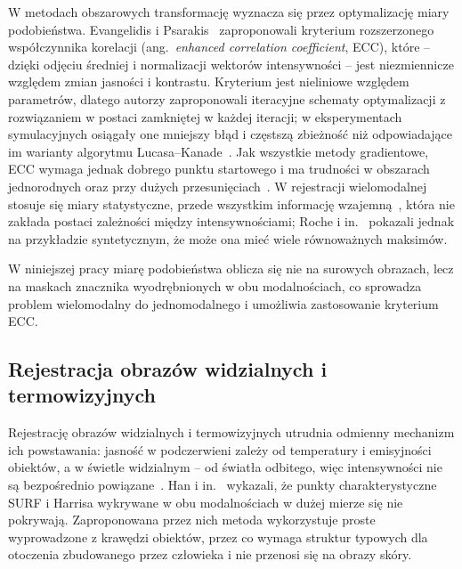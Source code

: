 W metodach obszarowych transformację wyznacza się przez optymalizację miary podobieństwa. Evangelidis i Psarakis~\cite{evangelidis2008} zaproponowali kryterium rozszerzonego współczynnika korelacji (ang.~\textit{enhanced correlation coefficient}, ECC), które -- dzięki odjęciu średniej i normalizacji wektorów intensywności -- jest niezmiennicze względem zmian jasności i kontrastu. Kryterium jest nieliniowe względem parametrów, dlatego autorzy zaproponowali iteracyjne schematy optymalizacji z rozwiązaniem w postaci zamkniętej w każdej iteracji; w eksperymentach symulacyjnych osiągały one mniejszy błąd i częstszą zbieżność niż odpowiadające im warianty algorytmu Lucasa--Kanade~\cite{evangelidis2008}. Jak wszystkie metody gradientowe, ECC wymaga jednak dobrego punktu startowego i ma trudności w obszarach jednorodnych oraz przy dużych przesunięciach~\cite{evangelidis2008}. W rejestracji wielomodalnej stosuje się miary statystyczne, przede wszystkim informację wzajemną~\cite{zitova2003}, która nie zakłada postaci zależności między intensywnościami; Roche i in.~\cite{correlation-ratio} pokazali jednak na przykładzie syntetycznym, że może ona mieć wiele równoważnych maksimów.

W niniejszej pracy miarę podobieństwa oblicza się nie na surowych obrazach, lecz na maskach znacznika wyodrębnionych w obu modalnościach, co sprowadza problem wielomodalny do jednomodalnego i umożliwia zastosowanie kryterium ECC.

\subsection{Rejestracja obrazów widzialnych i termowizyjnych}
\label{sec:rgb-ir}

Rejestrację obrazów widzialnych i termowizyjnych utrudnia odmienny mechanizm ich powstawania: jasność w podczerwieni zależy od temperatury i emisyjności obiektów, a w świetle widzialnym -- od światła odbitego, więc intensywności nie są bezpośrednio powiązane~\cite{visible-and-infared}. Han i in.~\cite{visible-and-infared} wykazali, że punkty charakterystyczne SURF i Harrisa wykrywane w obu modalnościach w dużej mierze się nie pokrywają. Zaproponowana przez nich metoda wykorzystuje proste wyprowadzone z krawędzi obiektów, przez co wymaga struktur typowych dla otoczenia zbudowanego przez człowieka i nie przenosi się na obrazy skóry.


